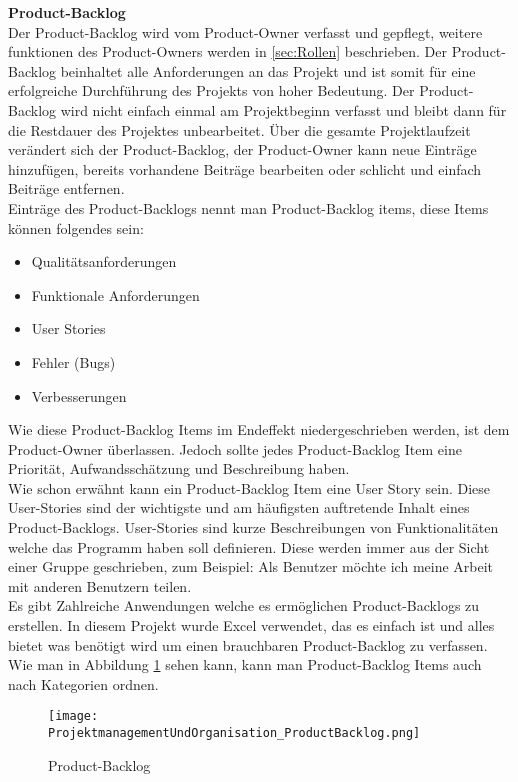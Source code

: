 			\textbf{Product-Backlog} \\
				Der Product-Backlog wird vom Product-Owner verfasst und gepflegt, weitere funktionen des Product-Owners werden in \ref{sec:Rollen} beschrieben. Der Product-Backlog beinhaltet alle Anforderungen an das Projekt und ist somit für eine erfolgreiche Durchführung des Projekts von hoher Bedeutung. Der Product-Backlog wird nicht einfach einmal am Projektbeginn verfasst und bleibt dann für die Restdauer des Projektes unbearbeitet. Über die gesamte Projektlaufzeit verändert sich der Product-Backlog, der Product-Owner kann neue Einträge hinzufügen, bereits vorhandene Beiträge bearbeiten oder schlicht und einfach Beiträge entfernen. \\
				Einträge des Product-Backlogs nennt man Product-Backlog items, diese Items können folgendes sein: 
				\begin{itemize}
					\item Qualitätsanforderungen
					\item Funktionale Anforderungen
					\item User Stories
					\item Fehler (Bugs)
					\item Verbesserungen
				\end{itemize}
				Wie diese Product-Backlog Items im Endeffekt niedergeschrieben werden, ist dem Product-Owner überlassen. Jedoch sollte jedes Product-Backlog Item eine Priorität, Aufwandsschätzung und Beschreibung haben. \textcite{ScrumProduct-Backlog} \\
				Wie schon erwähnt kann ein Product-Backlog Item eine User Story sein. Diese User-Stories sind der wichtigste und am häufigsten auftretende Inhalt eines Product-Backlogs. User-Stories sind kurze Beschreibungen von Funktionalitäten welche das Programm haben soll definieren. Diese werden immer aus der Sicht einer Gruppe geschrieben, zum Beispiel: Als Benutzer möchte ich meine Arbeit mit anderen Benutzern teilen. \\
				Es gibt Zahlreiche Anwendungen welche es ermöglichen Product-Backlogs zu erstellen. In diesem Projekt wurde Excel verwendet, das es einfach ist und alles bietet was benötigt wird um einen brauchbaren Product-Backlog zu verfassen. Wie man in Abbildung \ref{fig:productBacklog} sehen kann, kann man Product-Backlog Items auch nach Kategorien ordnen. \\
\begin{figure}[H]
	\texttt{[image: ProjektmanagementUndOrganisation\_ProductBacklog.png]}
    \caption{Product-Backlog}
    \label{fig:productBacklog}
\end{figure}
				
